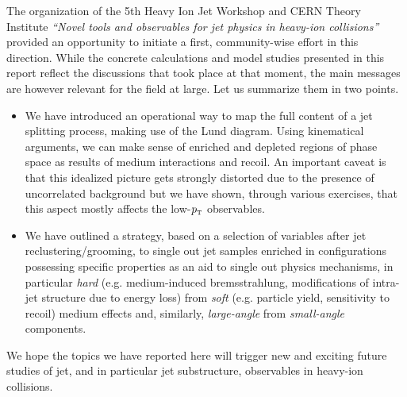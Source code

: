 The organization of the 5th Heavy Ion Jet Workshop and CERN Theory Institute {\sl ``Novel tools and observables for jet physics in heavy-ion collisions''} provided an opportunity to initiate a first, community-wise effort in this direction.
While the concrete calculations and model studies presented in this report reflect the discussions that took place at that moment, the main messages are however relevant for the field at large. Let us summarize them in two points.
\begin{itemize}

\item We have introduced an operational way to map the full content of a jet splitting process, making use of the Lund diagram. Using kinematical arguments, we can make sense of enriched and depleted regions of phase space as results of medium interactions and recoil. An important caveat is that this idealized picture gets strongly distorted due to the presence of uncorrelated background but we have shown, through various exercises, that this aspect mostly affects the low-$p_{\text{\tiny T}}$ observables.

\item We have outlined a strategy, based on a selection of variables after jet reclustering/grooming, to single out jet samples enriched in configurations possessing specific properties as an aid to single out physics mechanisms, in particular \textsl{hard} (e.g. medium-induced bremsstrahlung, modifications of intra-jet structure due to energy loss) from \textsl{soft} (e.g. particle yield, sensitivity to recoil) medium effects and, similarly, \textsl{large-angle} from \textsl{small-angle} components.

\end{itemize}
We hope the topics we have reported here will trigger new and exciting future studies of jet, and in particular jet substructure, observables in heavy-ion collisions.


